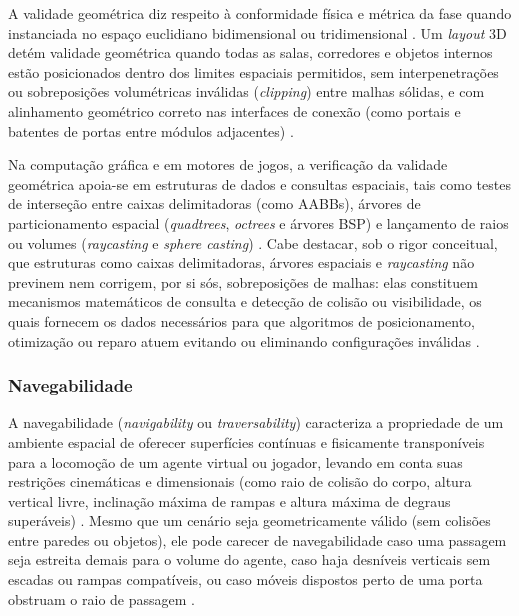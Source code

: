 A validade geométrica diz respeito à conformidade física e métrica da fase quando instanciada no espaço euclidiano bidimensional ou tridimensional \cite{sun2024roomplanner, xu2025constraint, feng2026repurposing3dgenerativemodel}. Um \textit{layout} 3D detém validade geométrica quando todas as salas, corredores e objetos internos estão posicionados dentro dos limites espaciais permitidos, sem interpenetrações ou sobreposições volumétricas inválidas (\textit{clipping}) entre malhas sólidas, e com alinhamento geométrico correto nas interfaces de conexão (como portais e batentes de portas entre módulos adjacentes) \cite{sun2024roomplanner, xu2025constraint, xu2025databasedrivenframework3dlevel}.

Na computação gráfica e em motores de jogos, a verificação da validade geométrica apoia-se em estruturas de dados e consultas espaciais, tais como testes de interseção entre caixas delimitadoras (como AABBs), árvores de particionamento espacial (\textit{quadtrees}, \textit{octrees} e árvores BSP) e lançamento de raios ou volumes (\textit{raycasting} e \textit{sphere casting}) \cite{shaker2016constructive, sun2024roomplanner, xu2025constraint, xu2025databasedrivenframework3dlevel}. Cabe destacar, sob o rigor conceitual, que estruturas como caixas delimitadoras, árvores espaciais e \textit{raycasting} não previnem nem corrigem, por si sós, sobreposições de malhas: elas constituem mecanismos matemáticos de consulta e detecção de colisão ou visibilidade, os quais fornecem os dados necessários para que algoritmos de posicionamento, otimização ou reparo atuem evitando ou eliminando configurações inválidas \cite{shaker2016constructive, xu2025constraint}.

\subsubsection{Navegabilidade}
\label{sec:navegabilidade}

A navegabilidade (\textit{navigability} ou \textit{traversability}) caracteriza a propriedade de um ambiente espacial de oferecer superfícies contínuas e fisicamente transponíveis para a locomoção de um agente virtual ou jogador, levando em conta suas restrições cinemáticas e dimensionais (como raio de colisão do corpo, altura vertical livre, inclinação máxima de rampas e altura máxima de degraus superáveis) \cite{sun2024roomplanner, xu2025constraint, xu2025databasedrivenframework3dlevel}. Mesmo que um cenário seja geometricamente válido (sem colisões entre paredes ou objetos), ele pode carecer de navegabilidade caso uma passagem seja estreita demais para o volume do agente, caso haja desníveis verticais sem escadas ou rampas compatíveis, ou caso móveis dispostos perto de uma porta obstruam o raio de passagem \cite{sun2024roomplanner, xu2025databasedrivenframework3dlevel}.

